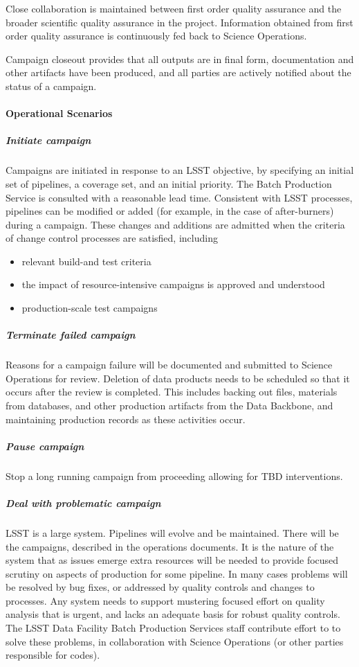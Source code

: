 Close collaboration is maintained between first order quality assurance and the 
broader scientific quality assurance in the project. Information obtained from 
first order quality assurance is continuously fed back to Science Operations. 

Campaign closeout provides that all outputs are in final form, documentation and 
other artifacts have been produced, and all parties are actively notified about 
the status of a campaign.

\paragraph{Operational Scenarios}

\subparagraph{Initiate campaign}

Campaigns are initiated in response to an LSST objective, by specifying an 
initial set of pipelines, a coverage set, and an initial priority. The Batch 
Production Service is consulted with a reasonable lead time. Consistent with 
LSST processes, pipelines can be modified or added (for example, in the case of 
after-burners) during a campaign. These changes and additions are admitted when 
the criteria of change control processes are satisfied, including 

\begin{itemize}

\item relevant build-and test criteria

\item the impact of resource-intensive campaigns is approved and understood

\item production-scale test campaigns

\end{itemize}

\subparagraph{Terminate failed campaign}
Reasons for a campaign failure will be documented and submitted to Science 
Operations for review. Deletion of data products needs to be scheduled so that 
it occurs after the review is completed. This includes backing out files, materials 
from databases, and other production artifacts from the Data Backbone, and 
maintaining production records as these activities occur.

\subparagraph{Pause campaign}
Stop a long running campaign from proceeding allowing for TBD interventions. 

\subparagraph{Deal with problematic campaign}
LSST is a large system. Pipelines will evolve and be maintained. There will be 
the campaigns, described in the operations documents. It is the nature of the 
system that as issues emerge extra resources will be needed to provide focused 
scrutiny on aspects of production for some pipeline. In many cases problems will 
be resolved by bug fixes, or addressed by quality controls and changes to 
processes. Any system needs to support mustering focused effort on quality 
analysis that is urgent, and lacks an adequate basis for robust quality controls.  
The LSST Data Facility Batch Production Services staff contribute effort to to solve 
these problems, in collaboration with Science Operations (or other parties 
responsible for codes).

